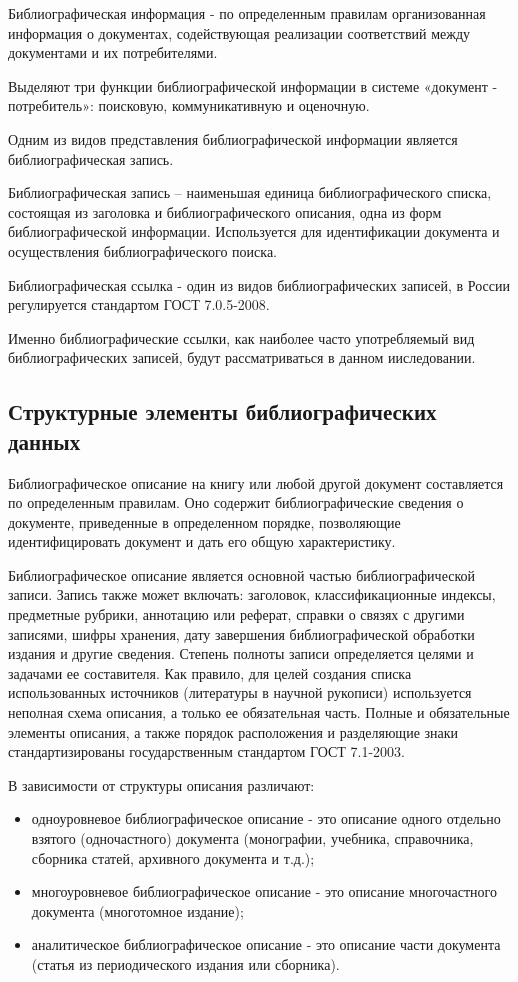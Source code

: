 Библиографическая информация - по определенным правилам организованная информация о документах, содействующая реализации соответствий между документами и их потребителями.

Выделяют три функции библиографической информации в системе «документ - потребитель»: поисковую, коммуникативную и оценочную.

Одним из видов представления библиографической информации является библиографическая запись.

Библиографическая запись -- наименьшая единица библиографического списка, состоящая из заголовка и библиографического описания, одна из форм библиографической информации. Используется для идентификации документа и осуществления библиографического поиска.

Библиографическая ссылка - один из видов библиографических записей, в России регулируется стандартом ГОСТ 7.0.5-2008.

Именно библиографические ссылки, как наиболее часто употребляемый вид библиографических записей, будут рассматриваться в данном ииследовании.

\subsection{Структурные элементы библиографических данных}
Библиографическое описание на книгу или любой другой документ составляется по определенным правилам. Оно содержит библиографические сведения о документе, приведенные в определенном порядке, позволяющие идентифицировать документ и дать его общую характеристику.

Библиографическое описание является основной частью библиографической записи. Запись также может включать: заголовок, классификационные индексы, предметные рубрики, аннотацию или реферат, справки о связях с другими записями, шифры хранения, дату завершения библиографической обработки издания и другие сведения. Степень полноты записи определяется целями и задачами ее составителя. Как правило, для целей создания списка использованных источников (литературы в научной рукописи) используется неполная схема описания, а только ее обязательная часть. Полные и обязательные элементы описания, а также порядок расположения и разделяющие знаки стандартизированы государственным стандартом ГОСТ 7.1-2003.

В зависимости от структуры описания различают:
\begin{itemize}
	\item одноуровневое библиографическое описание - это описание одного отдельно взятого (одночастного) документа (монографии, учебника, справочника, сборника статей, архивного документа и т.д.);
	\item многоуровневое библиографическое описание - это описание многочастного документа (многотомное издание);
	\item аналитическое библиографическое описание - это описание части документа (статья из периодического издания или сборника).
\end{itemize}

